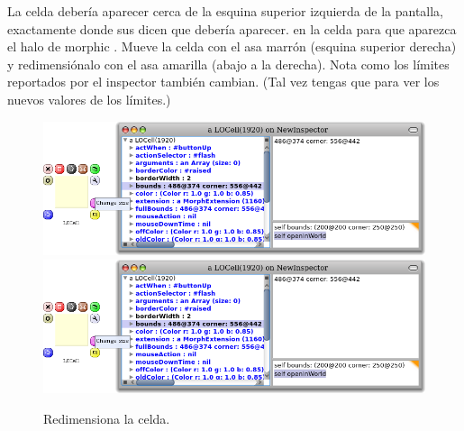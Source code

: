 \documentclass[a4paper,10pt,twoside]{book}
\begin{document}

La celda debería aparecer cerca de la esquina superior izquierda de la pantalla, exactamente donde sus  dicen que debería aparecer. 
\metaclick en la celda para que aparezca el halo de morphic . %
Mueve la celda con el asa marrón (esquina superior derecha) y redimensiónalo con el asa amarilla (abajo a la derecha).
Nota como los límites reportados por el inspector también cambian. 
(Tal vez tengas que \actclick{}  para ver los nuevos valores de los límites.)



\begin{figure}[htbp]
\centering
\ifluluelse
	{\includegraphics[width=\textwidth]{LOCellResize} }
	{\includegraphics[scale=0.7]{LOCellResize} }
\caption{Redimensiona la celda.}
\end{figure}
\end{document}
